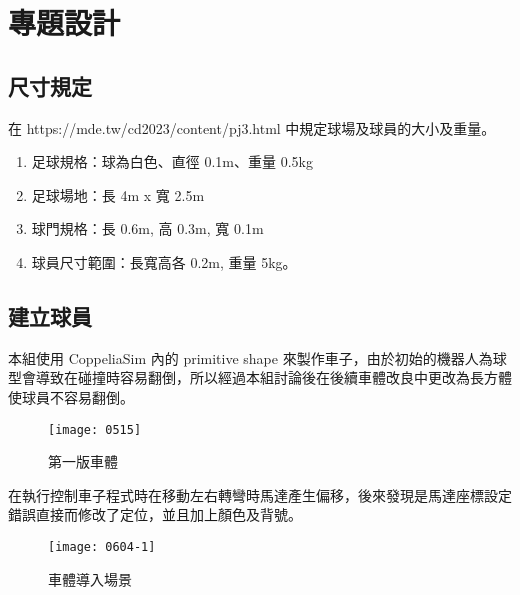 \chapter{專題設計}
\renewcommand{\baselinestretch}{10.0} %
\setcounter{page}{2}  %
\fontsize{14pt}{2.5pt}\sectionef

\section{尺寸規定}
在 https://mde.tw/cd2023/content/pj3.html 中規定球場及球員的大小及重量。\\
\begin{enumerate}
\item 足球規格：球為白色、直徑 0.1m、重量 0.5kg\\
\item 足球場地：長 4m x 寬 2.5m\\
\item 球門規格：長 0.6m, 高 0.3m, 寬 0.1m\\
\item 球員尺寸範圍：長寬高各 0.2m, 重量 5kg。\\
\end{enumerate}
\renewcommand{\baselinestretch}{0.5} %

\section{建立球員}
本組使用 CoppeliaSim 內的 primitive shape 來製作車子，由於初始的機器人為球型會導致在碰撞時容易翻倒，所以經過本組討論後在後續車體改良中更改為長方體使球員不容易翻倒。\\
\begin{figure}[hbt!]
\begin{center}
\texttt{[image: 0515]}
\caption{\Large 第一版車體}\label{車體}
\end{center}
\end{figure}
在執行控制車子程式時在移動左右轉彎時馬達產生偏移，後來發現是馬達座標設定錯誤直接而修改了定位，並且加上顏色及背號。
\begin{figure}[hbt!]
\begin{center}
\texttt{[image: 0604-1]}
\caption{\Large 車體導入場景}\label{車體導入場景}
\end{center}
\end{figure}


